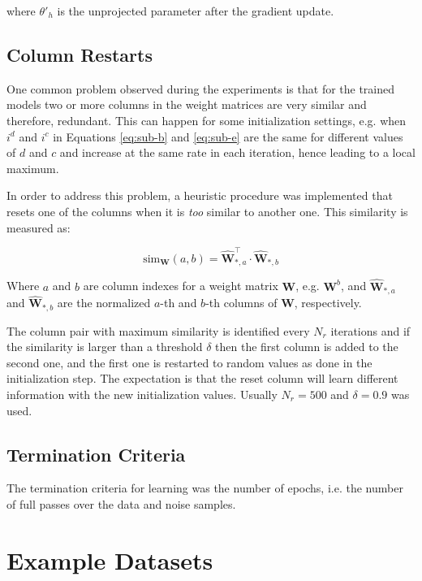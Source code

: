 where $\theta'_{h}$ is the unprojected parameter after the gradient update.

\subsection{Column Restarts}

One common problem observed during the experiments is that for the trained models two or more columns in the weight matrices are very similar and therefore, redundant. This can happen for some initialization settings, e.g. when $i^{d}$ and $i^{c}$ in Equations \eqref{eq:sub-b} and \eqref{eq:sub-e} are the same for different values of $d$ and $c$ and increase at the same rate in each iteration, hence leading to a local maximum.

In order to address this problem, a heuristic procedure was implemented that resets one of the columns when it is \emph{too} similar to another one. This similarity is measured as:

\begin{equation}
  \mathrm{sim}_{\mathbf{W}}(a,b) = \hat{\mathbf{W}}_{*,a}^{\intercal} \cdot \hat{\mathbf{W}}_{*,b}
\end{equation}

Where $a$ and $b$ are column indexes for a weight matrix $\mathbf{W}$, e.g. $\mathbf{W}^{b}$, and $\hat{\mathbf{W}}_{*,a}$ and $\hat{\mathbf{W}}_{*,b}$ are the normalized $a$-th and $b$-th columns of $\mathbf{W}$, respectively.

The column pair with maximum similarity is identified every $N_{r}$ iterations and if the similarity is larger than a threshold $\delta$ then the first column is added to the second one, and the first one is restarted to random values as done in the initialization step. The expectation is that the reset column will learn different information with the new initialization values. Usually $N_{r} = 500$ and $\delta = 0.9$ was used.

\subsection{Termination Criteria}

The termination criteria for learning was the number of epochs, i.e. the number of full passes over the data and noise samples.

\section{Example Datasets}


